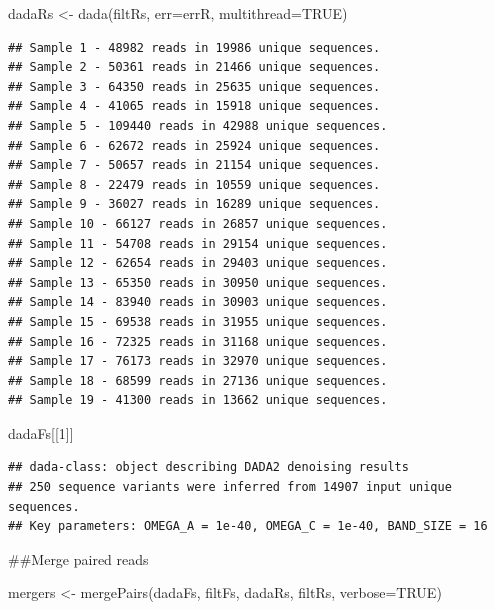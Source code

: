 \documentclass[
]{article}
\newenvironment{Shaded}{\begin{snugshade}}{\end{snugshade}}
\newcommand{\AttributeTok}[1]{\textcolor[rgb]{0.77,0.63,0.00}{#1}}
\newcommand{\ConstantTok}[1]{\textcolor[rgb]{0.00,0.00,0.00}{#1}}
\newcommand{\DecValTok}[1]{\textcolor[rgb]{0.00,0.00,0.81}{#1}}
\newcommand{\FunctionTok}[1]{\textcolor[rgb]{0.00,0.00,0.00}{#1}}
\newcommand{\NormalTok}[1]{#1}
\newcommand{\OtherTok}[1]{\textcolor[rgb]{0.56,0.35,0.01}{#1}}
\begin{document}
\begin{Shaded}
\begin{Highlighting}[]
\NormalTok{dadaRs }\OtherTok{\textless{}{-}} \FunctionTok{dada}\NormalTok{(filtRs, }\AttributeTok{err=}\NormalTok{errR, }\AttributeTok{multithread=}\ConstantTok{TRUE}\NormalTok{)}
\end{Highlighting}
\end{Shaded}

\begin{verbatim}
## Sample 1 - 48982 reads in 19986 unique sequences.
## Sample 2 - 50361 reads in 21466 unique sequences.
## Sample 3 - 64350 reads in 25635 unique sequences.
## Sample 4 - 41065 reads in 15918 unique sequences.
## Sample 5 - 109440 reads in 42988 unique sequences.
## Sample 6 - 62672 reads in 25924 unique sequences.
## Sample 7 - 50657 reads in 21154 unique sequences.
## Sample 8 - 22479 reads in 10559 unique sequences.
## Sample 9 - 36027 reads in 16289 unique sequences.
## Sample 10 - 66127 reads in 26857 unique sequences.
## Sample 11 - 54708 reads in 29154 unique sequences.
## Sample 12 - 62654 reads in 29403 unique sequences.
## Sample 13 - 65350 reads in 30950 unique sequences.
## Sample 14 - 83940 reads in 30903 unique sequences.
## Sample 15 - 69538 reads in 31955 unique sequences.
## Sample 16 - 72325 reads in 31168 unique sequences.
## Sample 17 - 76173 reads in 32970 unique sequences.
## Sample 18 - 68599 reads in 27136 unique sequences.
## Sample 19 - 41300 reads in 13662 unique sequences.
\end{verbatim}

\begin{Shaded}
\begin{Highlighting}[]
\NormalTok{dadaFs[[}\DecValTok{1}\NormalTok{]]}
\end{Highlighting}
\end{Shaded}

\begin{verbatim}
## dada-class: object describing DADA2 denoising results
## 250 sequence variants were inferred from 14907 input unique sequences.
## Key parameters: OMEGA_A = 1e-40, OMEGA_C = 1e-40, BAND_SIZE = 16
\end{verbatim}

\#\#Merge paired reads

\begin{Shaded}
\begin{Highlighting}[]
\NormalTok{mergers }\OtherTok{\textless{}{-}} \FunctionTok{mergePairs}\NormalTok{(dadaFs, filtFs, dadaRs, filtRs, }\AttributeTok{verbose=}\ConstantTok{TRUE}\NormalTok{)}
\end{Highlighting}
\end{Shaded}
\end{document}
